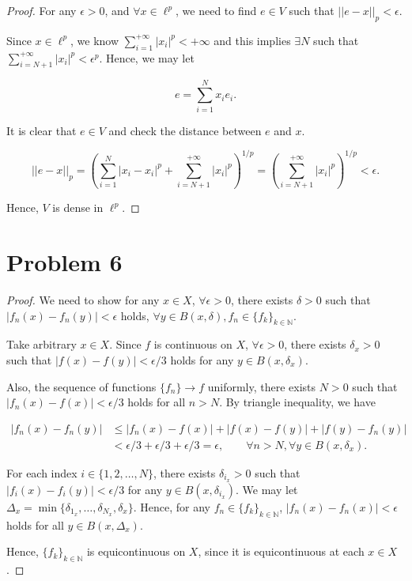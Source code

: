 \documentclass[12pt]{article}
\begin{document}
\begin{proof}

For any $\epsilon>0$, and $\forall x\in \ell^p$, we need to find $e \in V$ such that $||e-x||_p < \epsilon$.

Since $x\in\ell^p$, we know $\sum_{i=1}^{+\infty} |x_i|^p < +\infty$ and this implies $\exists N$ such that $\sum_{i=N+1}^{+\infty} |x_i|^p < \epsilon^p$. Hence, we may let 

$$
e = \sum_{i=1}^{N} x_i e_i. 
$$

It is clear that $e\in V$ and check the distance between $e$ and $x$.

$$
||e-x||_p = \left( \sum_{i=1}^{N} |x_i -x_i|^p + \sum_{i=N+1}^{+\infty} |x_i|^p \right)^{1/p} = \left( \sum_{i=N+1}^{+\infty} |x_i|^p \right)^{1/p}<\epsilon.
$$

Hence, $V$ is dense in $\ell^p$.

\end{proof}

\section*{Problem 6}

\begin{proof}

We need to show for any $x\in X$, $\forall \epsilon > 0$, there exists $\delta >0$ such that $|f_n(x) - f_n(y)| < \epsilon$ holds, $\forall y\in B(x, \delta), f_n\in \{f_k\}_{k\in\mathbb N}$. 

Take arbitrary $x \in X$. Since $f$ is continuous on $X$, $\forall \epsilon > 0$, there exists $\delta_x > 0$ such that $|f(x) - f(y)| < \epsilon/3$ holds for any $y\in B(x, \delta_x)$. 

Also, the sequence of functions $\{f_n\} \rightarrow f$ uniformly, there exists $N>0$ such that $|f_n(x) - f(x)| < \epsilon /3$ holds for all $n>N$. By triangle inequality, we have 

$$
\begin{aligned}
|f_n(x) - f_n(y)| & \leqslant |f_n(x) - f(x)| + |f(x) - f(y)| + |f(y) - f_n(y)| \\
& < \epsilon/3 + \epsilon/3 + \epsilon/3 = \epsilon, \qquad \forall n>N, \forall y\in B(x, \delta_x).
\end{aligned}
$$

For each index  $i\in\{1, 2, \dots, N\}$, there exists $\delta_{i_x} > 0$ such that $|f_i(x) - f_i(y)|<\epsilon/3$ for any $y\in B(x, \delta_{i_x})$. We may let $\Delta_x = \min\{\delta_{1_x}, \dots, \delta_{N_x}, \delta_x\}$. Hence, for any $f_n \in \{f_k\}_{k\in\mathbb N}$, $|f_n(x) - f_n(x)|<\epsilon$ holds for all $y\in B(x, \Delta_x)$.

Hence, $\{f_k\}_{k\in\mathbb N}$ is equicontinuous on $X$, since it is equicontinuous at each $x\in X$.

\end{proof}
\end{document}
